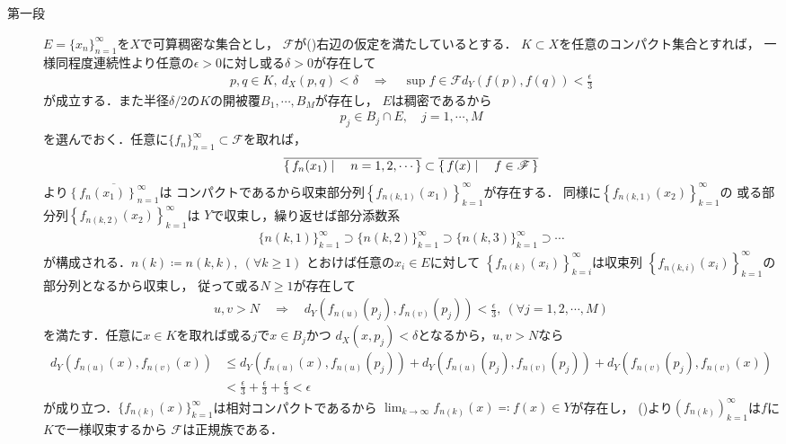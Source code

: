 	\begin{prf}\mbox{}
		\begin{description}
			\item[第一段]
				$E = \{x_n\}_{n=1}^\infty$を$X$で可算稠密な集合とし，
				$\mathscr{F}$が()右辺の仮定を満たしているとする．
				$K \subset X$を任意のコンパクト集合とすれば，
				一様同程度連続性より任意の$\epsilon > 0$に対し或る$\delta > 0$が存在して
				\begin{align}
					p,q \in K,\ d_X(p,q) < \delta \quad \Longrightarrow \quad
					\sup{f \in \mathscr{F}}{d_Y(f(p),f(q))} < \frac{\epsilon}{3}
				\end{align}
				が成立する．また半径$\delta/2$の$K$の開被覆$B_1,\cdots,B_M$が存在し，
				$E$は稠密であるから
				\begin{align}
					p_j \in B_j \cap E, \quad j=1,\cdots,M
				\end{align}
				を選んでおく．任意に$\{f_n\}_{n=1}^\infty \subset \mathscr{F}$を取れば，
				\begin{align}
					\overline{\left\{\, f_n(x_1) \mid \quad n=1,2,\cdots\, \right\}}
					\subset \overline{\left\{\, f(x) \mid \quad f \in \mathscr{F}\, \right\}}
				\end{align}
				より$\overline{\left\{f_{n}(x_1)\right\}_{n=1}^\infty}$は
				コンパクトであるから収束部分列$\left\{f_{n(k,1)}(x_1)\right\}_{k=1}^\infty$が存在する．
				同様に$\left\{f_{n(k,1)}(x_2)\right\}_{k=1}^\infty$の
				或る部分列$\left\{f_{n(k,2)}(x_2)\right\}_{k=1}^\infty$は
				$Y$で収束し，繰り返せば部分添数系
				\begin{align}
					\{n(k,1)\}_{k=1}^\infty \supset
					\{n(k,2)\}_{k=1}^\infty \supset
					\{n(k,3)\}_{k=1}^\infty \supset
					\cdots
				\end{align}
				が構成される．$n(k) \coloneqq n(k,k),\ (\forall k \geq 1)$
				とおけば任意の$x_i \in E$に対して
				$\left\{f_{n(k)}(x_i)\right\}_{k=i}^\infty$は収束列
				$\left\{f_{n(k,i)}(x_i)\right\}_{k=1}^\infty$の部分列となるから収束し，
				従って或る$N \geq 1$が存在して
				\begin{align}
					u,v > N \quad \Longrightarrow \quad
					d_Y\left(f_{n(u)}(p_j),f_{n(v)}(p_j)\right) < \frac{\epsilon}{3},
					\ (\forall j=1,2,\cdots,M)
				\end{align}
				を満たす．任意に$x \in K$を取れば或る$j$で$x \in B_j$かつ
				$d_X(x,p_j) < \delta$となるから，$u,v > N$なら
				\begin{align}
					d_Y(f_{n(u)}(x),f_{n(v)}(x)) 
					&\leq d_Y\left(f_{n(u)}(x),f_{n(u)}(p_j)\right) 
					+ d_Y\left(f_{n(u)}(p_j),f_{n(v)}(p_j)\right)
					+ d_Y\left(f_{n(v)}(p_j),f_{n(v)}(x)\right) \\
					&< \frac{\epsilon}{3} + \frac{\epsilon}{3} + \frac{\epsilon}{3} < \epsilon
					\label{eq:thm_Ascoli_Arzela_2}
				\end{align}
				が成り立つ．$\{f_{n(k)}(x)\}_{k=1}^\infty$は相対コンパクトであるから
				$\lim_{k \to \infty} f_{n(k)}(x) \eqqcolon f(x) \in Y$が存在し，
				()より$\left(f_{n(k)}\right)_{k=1}^\infty$は$f$に$K$で一様収束するから
				$\mathscr{F}$は正規族である．
			

\end{description}
\end{prf}
